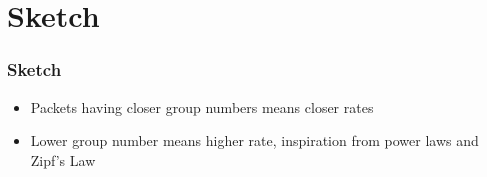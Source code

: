 \documentclass{beamer}
\begin{document}

\section{Sketch}
\begin{frame}
  \frametitle{Sketch}
  \begin{itemize}
    \item<2-> Packets having closer group numbers means closer rates
    \item<3-> Lower group number means higher rate, inspiration from power laws and Zipf's Law
    \end{itemize}
\end{frame}
\end{document}
